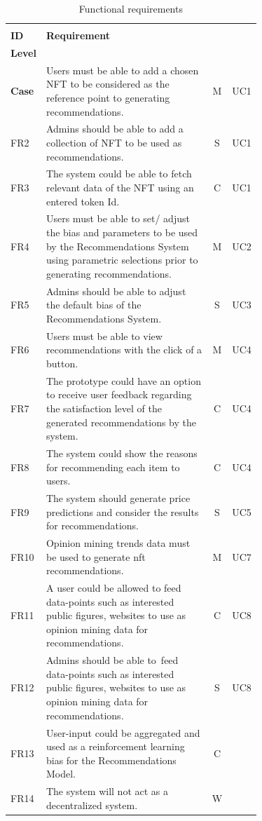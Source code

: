 \begin{longtable}{|l|p{0.71\linewidth}|c|l|}
\caption{Functional requirements}\\ 
\hline
\begin{tabular}[c]{@{}l@{}}\textbf{FR}\\\textbf{ID}\end{tabular}
& \textbf{Requirement} & \begin{tabular}[c]{@{}c@{}}\textbf{Priority}\\\textbf{Level}\end{tabular} & 
\begin{tabular}[c]{@{}c@{}}\textbf{Use}\\\textbf{Case}\end{tabular}
\endfirsthead 
\hline
FR1 & Users must be able to add a chosen NFT to be considered as the reference point to generating recommendations. & M & UC1 \\ 
\hline
FR2 & Admins should be able to add a collection of NFT to be used as recommendations. & S & UC1 \\ 
\hline
FR3 & The system could be able to fetch relevant data of the NFT using an entered token Id. & C & UC1 \\ 
\hline
FR4 & Users must be able to set/ adjust the bias and parameters to be used by the Recommendations System using parametric selections prior to generating recommendations. & M & UC2 \\ 
\hline
FR5 & Admins should be able to adjust the default bias of the Recommendations System. & S & UC3 \\ 
\hline
FR6 & Users must be able to view recommendations with the click of a button. & M & UC4 \\
\hline
FR7 & The prototype could have an option to receive user feedback regarding the satisfaction level of the generated recommendations by the system. & C & UC4 \\
\hline
FR8 & The system could show the reasons for recommending each item to users. & C & UC4 \\ \hline
FR9 & The system should generate price predictions and consider the results for recommendations. & S & UC5 \\ 
\hline
FR10 & Opinion mining trends data must be used to generate \gls{nft} recommendations. & M & UC7 \\
\hline
FR11 & A user could be allowed to feed data-points such as interested public figures, websites to use as opinion mining data for recommendations. & C & UC8 \\ 
\hline
FR12 & Admins should be able to~feed data-points such as interested public figures, websites to use as opinion mining data for recommendations. & S & UC8 \\
\hline
FR13 & User-input could be aggregated and used as a reinforcement learning bias for the Recommendations Model. & C &  \\
\hline
FR14 & The system will not act as a decentralized system. & W &  \\
\hline
\end{longtable}


